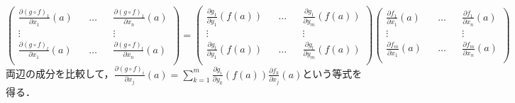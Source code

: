 \documentclass{jsarticle}
\def\vecb{\begin{pmatrix}}
\def\vece{\end{pmatrix}}
\def\dfrac{\displaystyle\frac}
\def\dsum{\displaystyle\sum}
\begin{document}
$$
\vecb
\dfrac{\partial (g\circ f)_1}{\partial x_1}(a) && \dots && \dfrac{\partial (g\circ f)_1}{\partial x_n}(a) \\
\vdots                                           &&         && \vdots \\
\dfrac{\partial (g\circ f)_l}{\partial x_1}(a)  && \dots && \dfrac{\partial (g\circ f)_l}{\partial x_n}(a) \\
\vece
=
\vecb
\dfrac{\partial g_1}{\partial y_1}(f(a)) && \dots && \dfrac{\partial g_1}{\partial y_m}(f(a)) \\
\vdots                                           &&         && \vdots \\
\dfrac{\partial g_l}{\partial y_1}(f(a))  && \dots && \dfrac{\partial g_l}{\partial y_m}(f(a)) \\
\vece
\vecb
\dfrac{\partial f_1}{\partial x_1}(a) && \dots && \dfrac{\partial f_1}{\partial x_n}(a) \\
\vdots                                           &&         && \vdots \\
\dfrac{\partial f_m}{\partial x_1}(a)  && \dots && \dfrac{\partial f_m}{\partial x_n}(a) \\
\vece
$$
両辺の成分を比較して，$\dfrac{\partial (g\circ f)_i}{\partial x_j}(a)=\dsum_{k=1}^m\dfrac{\partial g_i}{\partial y_k}(f(a))\dfrac{\partial f_k}{\partial x_j}(a)$という等式を得る．
\end{document}
